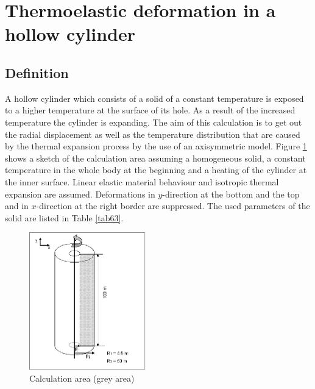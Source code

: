 \section{Thermoelastic deformation in a hollow cylinder}
\subsection{Definition}

A hollow cylinder which consists of a solid of a constant temperature is exposed to a higher temperature at the surface of its hole. As a result of the increased temperature the cylinder is expanding. The aim of this calculation is to get out the radial displacement as well as the temperature distribution that are caused by the thermal expansion process by the use of an axisymmetric model. 
Figure \ref{fig68} shows a sketch of the calculation area assuming a homogeneous solid, a constant temperature in the whole body at the beginning and a heating of the cylinder at the inner surface.
Linear elastic material behaviour and isotropic thermal expansion are assumed. Deformations in $y$-direction at the bottom and the top and in $x$-direction at the right border are suppressed. The used parameters of the solid are listed in Table \ref{tab63}.

\begin{figure}[htbp]
\centering
\includegraphics[width=0.45\textwidth]{PART_III/TM/figures/fig68}
\caption{Calculation area (grey area)}
\label{fig68}
\end{figure}

